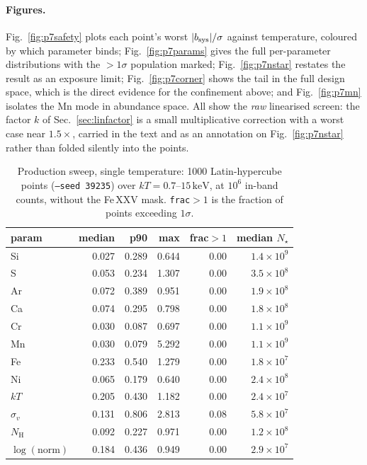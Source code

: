 \documentclass[11pt,a4paper]{article}
\newcommand{\nh}{N_{\mathrm{H}}}
\newcommand{\kev}{\,\mathrm{keV}}
\newcommand{\code}[1]{\texttt{#1}}
\begin{document}
\paragraph{Figures.} Fig.~\ref{fig:p7safety} plots each point's worst
$|b_{\rm sys}|/\sigma$ against temperature, coloured by which parameter binds;
Fig.~\ref{fig:p7params} gives the full per-parameter distributions with the
$>1\sigma$ population marked; Fig.~\ref{fig:p7nstar} restates the result as an
exposure limit; Fig.~\ref{fig:p7corner} shows the tail in the full design
space, which is the direct evidence for the confinement above; and
Fig.~\ref{fig:p7mn} isolates the Mn mode in abundance space. All show the
\emph{raw} linearised screen: the factor $k$ of Sec.~\ref{sec:linfactor} is a
small multiplicative correction with a worst case near $1.5\times$, carried in
the text and as an annotation on Fig.~\ref{fig:p7nstar} rather than folded
silently into the points.

\begin{table}[htbp]
\centering
\caption{Production sweep, single temperature: 1000 Latin-hypercube points
(\code{--seed 39235}) over $kT=0.7$--$15\kev$, at $10^{6}$ in-band counts,
without the Fe\,XXV mask. \code{frac${>}1$} is the fraction of points exceeding
$1\sigma$.}
\label{tab:p7single}
\begin{tabular}{lrrrrr}
\toprule
param & median & p90 & max & frac${>}1$ & median $N_\star$ \\
\midrule
Si                  & 0.027 & 0.289 & 0.644 & 0.00 & $1.4\times10^{9}$ \\
S                   & 0.053 & 0.234 & 1.307 & 0.00 & $3.5\times10^{8}$ \\
Ar                  & 0.072 & 0.389 & 0.951 & 0.00 & $1.9\times10^{8}$ \\
Ca                  & 0.074 & 0.295 & 0.798 & 0.00 & $1.8\times10^{8}$ \\
Cr                  & 0.030 & 0.087 & 0.697 & 0.00 & $1.1\times10^{9}$ \\
Mn                  & 0.030 & 0.079 & 5.292 & 0.00 & $1.1\times10^{9}$ \\
Fe                  & 0.233 & 0.540 & 1.279 & 0.00 & $1.8\times10^{7}$ \\
Ni                  & 0.065 & 0.179 & 0.640 & 0.00 & $2.4\times10^{8}$ \\
$kT$                & 0.205 & 0.430 & 1.182 & 0.00 & $2.4\times10^{7}$ \\
$\sigma_v$          & 0.131 & 0.806 & 2.813 & 0.08 & $5.8\times10^{7}$ \\
$\nh$               & 0.092 & 0.227 & 0.971 & 0.00 & $1.2\times10^{8}$ \\
$\log(\text{norm})$ & 0.184 & 0.436 & 0.949 & 0.00 & $2.9\times10^{7}$ \\
\bottomrule
\end{tabular}
\end{table}
\end{document}

